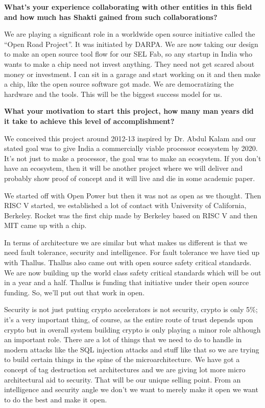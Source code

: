 \begin{multicols}{2}
{\bf What's your experience collaborating with other entities in this field and how much has Shakti gained from such collaborations? }

We are playing a significant role in a worldwide open source initiative called the ``Open Road Project''.  It was initiated by DARPA. We are now taking our design to make an open source tool flow for our SEL Fab, so any startup in India who wants to make a chip need not invest anything. They need not get scared about money or investment. I can sit in a garage and start working on it and then make a chip, like the open source software got made. We are democratizing the hardware and the tools. This will be the biggest success model for us.
\smallskip

{\bf What your motivation to start this project, how many man years did it take to achieve this level of accomplishment?}

We conceived this project around 2012-13 inspired by Dr. Abdul Kalam and our stated goal was to give India a commercially viable processor ecosystem by 2020. It's not just to make a processor, the goal was to make an ecosystem. If you don't have an ecosystem, then it will be another project where we will deliver and probably show proof of concept and it will live and die in some academic paper. 

We started off with Open Power but then it was not as open as we thought. Then RISC V started, we established a lot of contact with University of California, Berkeley. Rocket was the first chip made by Berkeley based on RISC V and then MIT came up with a chip.

In terms of architecture we are similar but what makes us different is that we need fault tolerance, security and intelligence. For fault tolerance we have tied up with Thallus. Thallus also came out with open source safety critical standards.  We are now building up the world class safety critical standards which will be out in a year and a half.  Thallus is funding that initiative under their open source funding.  So, we'll put out that work in open.

Security is not just putting crypto accelerators is not security, crypto is only 5\%; it's a very important thing, of course, as the entire route of trust depends upon crypto but in overall system building crypto is only playing a minor role although an important role. There are a lot of things that we need to do to handle in modern attacks like the SQL injection attacks and stuff like that so we are trying to build certain things in the spine of the microarchitecture. We have got a concept of tag destruction set architectures and we are giving lot more micro architectural aid to security. That will be our unique selling point. From an intelligence and security angle we don't we want to merely make it open we want to do the best and make it open.


\end{multicols}
